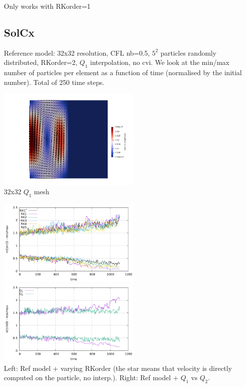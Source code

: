 Only works with RKorder=1

\newpage
\subsection*{SolCx}

Reference model: 32x32 resolution, CFL nb=0.5, $5^2$ particles randomly distributed, RKorder=2,
$Q_1$ interpolation, no cvi.
We look at the min/max number of particles per element as a function of time (normalised 
by the initial number). Total of 250 time steps.

\begin{center}
\includegraphics[width=7cm]{python_codes/fieldstone_30/results_solcx/vel}\\
{\captionfont 32x32 $Q_1$ mesh}
\end{center}

\begin{center}
\includegraphics[width=7cm]{python_codes/fieldstone_30/results_solcx/markercount_rk12345}
\includegraphics[width=7cm]{python_codes/fieldstone_30/results_solcx/markercount_q12}\\
{\captionfont Left: Ref model + varying RKorder (the star means that velocity 
is directly computed on the particle, no interp.). Right: Ref model + $Q_1$ vs $Q_2$. }
\end{center}


